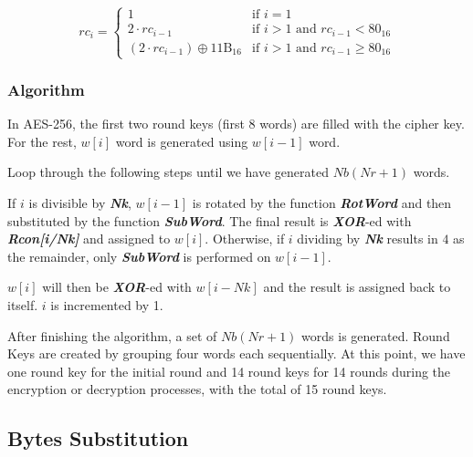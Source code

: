 \documentclass[a4paper, 10pt]{article}
\begin{document}
                    \begin{multicols}{2}
                        \begin{equation}
                            rc_{i}=
                            \begin{cases}
                                1 & \text{if } i=1\\
                                2 \cdot  rc_{i-1} & \text{if } i>1 \text{ and } rc_{i-1}<80_{16}\\
                                \left(2 \cdot  rc_{i-1}\right)\oplus 11\text{B}_{16} & \text{if } i>1 \text{ and } rc_{i-1} \ge 80_{16}
                            \end{cases}
                        \end{equation}

            \subsubsection{Algorithm}
                In AES-256, the first two round keys (first 8 words) are filled with the cipher key. For the rest, $w[i]$ word is generated using $w[i-1]$ word.

                Loop through the following steps until we have generated $Nb(Nr+1)$ words.

                If $i$ is divisible by \textbf{\textit{Nk}}, $w[i-1]$ is rotated by the function \textbf{\textit{RotWord}} and then substituted by the function \textbf{\textit{SubWord}}. The final result is \textbf{\textit{XOR}}-ed with \textbf{\textit{Rcon[i/Nk]}} and assigned to $w[i]$. Otherwise, if $i$ dividing by \textbf{\textit{Nk}} results in $4$ as the remainder, only \textbf{\textit{SubWord}} is performed on $w[i-1]$.

                $w[i]$ will then be \textbf{\textit{XOR}}-ed with $w[i-Nk]$ and the result is assigned back to itself. $i$ is incremented by 1.

                After finishing the algorithm, a set of $Nb(Nr+1)$ words is generated. Round Keys are created by grouping four words each sequentially. At this point, we have one round key for the initial round and 14 round keys for 14 rounds during the encryption or decryption processes, with the total of 15 round keys.

            \subsection{Bytes Substitution}


\end{multicols}
\end{document}
